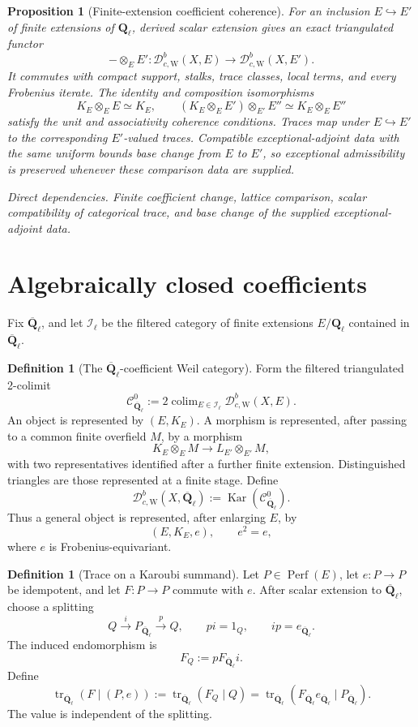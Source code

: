 \documentclass[10pt]{article}
\newtheorem{proposition}[theorem]{Proposition}
\theoremstyle{definition}
\newtheorem{definition}[theorem]{Definition}
\newcommand{\Ql}{\mathbf Q_\ell}
\newcommand{\Qlb}{\overline{\mathbf Q}_\ell}
\newcommand{\DbcW}{\mathcal D^b_{c,\mathrm W}}
\newcommand{\Perf}{\operatorname{Perf}}
\newcommand{\Kar}{\operatorname{Kar}}
\newcommand{\depends}[1]{\par\smallskip\noindent\textit{Direct dependencies.} #1\par}
\begin{document}
\begin{proposition}[Finite-extension coefficient coherence]
For an inclusion \(E\hookrightarrow E'\) of finite extensions of \(\Ql\),
derived scalar extension gives an exact triangulated functor
\[
 -\otimes_EE':\DbcW(X,E)\to\DbcW(X,E').
\]
It commutes with compact support, stalks, trace classes, local terms, and
every Frobenius iterate.  The identity and composition isomorphisms
\[
 K_E\otimes_EE\simeq K_E,\qquad
 (K_E\otimes_EE')\otimes_{E'}E''\simeq K_E\otimes_EE''
\]
satisfy the unit and associativity coherence conditions.  Traces map under
\(E\hookrightarrow E'\) to the corresponding \(E'\)-valued traces.
Compatible exceptional-adjoint data with the same uniform bounds base
change from \(E\) to \(E'\), so exceptional admissibility is preserved
whenever these comparison data are supplied.
\depends{Finite coefficient change, lattice comparison, scalar
compatibility of categorical trace, and base change of the supplied
exceptional-adjoint data.}
\end{proposition}

\section{Algebraically closed coefficients}

Fix \(\Qlb\), and let \(\mathcal I_\ell\) be the filtered category of finite
extensions \(E/\Ql\) contained in \(\Qlb\).

\begin{definition}[The \(\Qlb\)-coefficient Weil category]
Form the filtered triangulated 2-colimit
\[
 \mathcal C_{\Qlb}^{0}:=
 2\mathop{\mathrm{colim}}_{E\in\mathcal I_\ell}\DbcW(X,E).
\]
An object is represented by \((E,K_E)\).  A morphism is represented, after
passing to a common finite overfield \(M\), by a morphism
\[
 K_E\otimes_EM\longrightarrow L_{E'}\otimes_{E'}M,
\]
with two representatives identified after a further finite extension.
Distinguished triangles are those represented at a finite stage.  Define
\[
 \DbcW(X,\Qlb):=\Kar(\mathcal C_{\Qlb}^{0}).
\]
Thus a general object is represented, after enlarging \(E\), by
\[
 (E,K_E,e),\qquad e^2=e,
\]
where \(e\) is Frobenius-equivariant.
\end{definition}

\begin{definition}[Trace on a Karoubi summand]
Let \(P\in\Perf(E)\), let \(e:P\to P\) be idempotent, and let
\(F:P\to P\) commute with \(e\).  After scalar extension to \(\Qlb\), choose
a splitting
\[
 Q\xrightarrow{i}P_{\Qlb}\xrightarrow{p}Q,\qquad
 p i=1_Q,\qquad i p=e_{\Qlb}.
\]
The induced endomorphism is
\[
 F_Q:=pF_{\Qlb}i.
\]
Define
\[
 \operatorname{tr}_{\Qlb}(F\mid(P,e))
 :=
 \operatorname{tr}_{\Qlb}(F_Q\mid Q)
 =
 \operatorname{tr}_{\Qlb}(F_{\Qlb}e_{\Qlb}\mid P_{\Qlb}).
\]
The value is independent of the splitting.
\end{definition}
\end{document}
